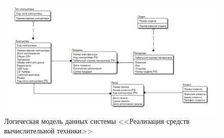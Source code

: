\documentclass[a4paper,14pt]{extarticle}
\begin{document}
\begin{figure}[htpb]
	\centering
	\includegraphics[width=1\linewidth]{images/2-method}
	\caption{Логическая модель данных системы <<Реализация средств вычислительной техники>>}
	\label{fig:2-method}
\end{figure}
\end{document}
